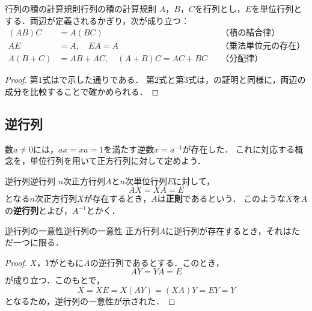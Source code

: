 \begin{prop}{行列の積の計算規則}{行列の積の計算規則}
  $A$，$B$，$C$を行列とし，$E$を単位行列とする．両辺が定義されるかぎり，次が成り立つ：
  \begin{align*}
    (AB)C &= A(BC) && \text{（積の結合律）} \\
    AE &= A, \quad EA = A && \text{（乗法単位元の存在）} \\
    A(B + C) &= AB + AC, \quad (A + B)C = AC + BC && \text{（分配律）}
  \end{align*}
\end{prop}

\begin{tleftbar}
\begin{proof}
  第$1$式はで示した通りである．
  第$2$式と第$3$式は，の証明と同様に，両辺の成分を比較することで確かめられる．
\end{proof}
\end{tleftbar}

\subsection{逆行列}

数$a\ne0$には，$ax=xa=1$を満たす逆数$x=a^{-1}$が存在した．
これに対応する概念を，単位行列を用いて正方行列に対して定めよう．

\begin{definition}{逆行列}{逆行列}
  $n$次正方行列$A$と$n$次単位行列$E$に対して，
  \[
    AX = XA = E
  \]
  となる$n$次正方行列$X$が存在するとき，$A$は\textbf{正則}であるという．
  このような$X$を$A$の\textbf{逆行列}とよび，$A^{-1}$とかく．
\end{definition}

\begin{prop}{逆行列の一意性}{逆行列の一意性}
  正方行列$A$に逆行列が存在するとき，それはただ一つに限る．
\end{prop}

\begin{tleftbar}
\begin{proof}
  $X$，$Y$がともに$A$の逆行列であるとする．このとき，
  \[
    AY = YA = E
  \]
  が成り立つ．このもとで，
  \[
    X = XE = X(AY) = (XA)Y = EY = Y
  \]
  となるため，逆行列の一意性が示された．
\end{proof}
\end{tleftbar}

